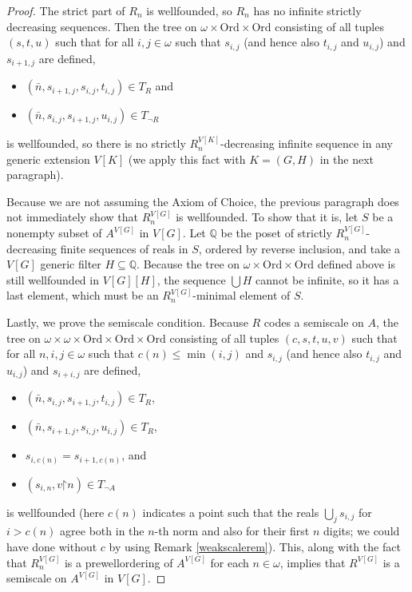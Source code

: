 \documentclass[10pt,a4paper]{amsart}
\newcommand{\Ord}{\mathrm{Ord}}
\newcommand{\restrict}{\mathord{\restriction}}
\begin{document}
\begin{proof}
The strict part of $R_n$ is wellfounded, so $R_n$ has no infinite strictly decreasing sequences.
 Then the tree on $\omega \times \Ord \times \Ord$ consisting of all tuples $(s, t, u)$
 such that for all $i,j \in \omega$ such that $s_{i,j}$ (and hence also $t_{i,j}$ and $u_{i,j}$) and $s_{i+1,j}$ are defined,
\begin{itemize}
 \item $(\bar{n}, s_{i+1, j}, s_{i,j}, t_{i,j}) \in T_R$ and
 \item $(\bar{n}, s_{i,j}, s_{i+1,j}, u_{i,j}) \in T_{\neg R}$
\end{itemize}
 is wellfounded, so there is no strictly $R^{V[K]}_n$-decreasing infinite sequence in any generic extension $V[K]$ (we apply this fact with $K = (G,H)$ in the next paragraph).

Because we are not assuming the Axiom of Choice, the previous paragraph does not immediately show that
 $R^{V[G]}_n$ is wellfounded.  
 To show that it is, let $S$ be a nonempty subset of $A^{V[G]}$ in $V[G]$.
 Let $\mathbb{Q}$ be the poset of strictly $R^{V[G]}_n$-decreasing finite sequences
 of reals in $S$, ordered by reverse inclusion,
 and take a $V[G]$ generic filter $H \subseteq \mathbb{Q}$.
 Because the tree on $\omega \times \Ord \times \Ord$
 defined above is still wellfounded in $V[G][H]$,
 the sequence
 $\bigcup H$ cannot be infinite, so it has a last element, which must be
 an $R^{V[G]}_n$-minimal element of $S$.

Lastly, we prove the semiscale condition.
Because $R$ codes a semiscale
on $A$, the tree on $\omega \times \omega \times \Ord \times \Ord \times \Ord$ consisting of all tuples
$(c, s, t, u, v)$ such that
for all $n,i,j \in \omega$ such that $c(n) \le \min(i,j)$ and
$s_{i,j}$ (and hence also $t_{i,j}$ and $u_{i,j}$) and $s_{i+i,j}$
are defined, 
\begin{itemize}
 \item $(\bar{n}, s_{i,j}, s_{i+1,j}, t_{i,j}) \in T_R$,
 \item $(\bar{n}, s_{i+1,j}, s_{i,j}, u_{i,j}) \in T_R$,
 \item $s_{i,c(n)} = s_{i+1,c(n)}$, and
 \item $(s_{i,n}, v \restrict n) \in T_{\neg A}$
\end{itemize}
is wellfounded (here $c(n)$ indicates a point such that the reals $\bigcup_{j}s_{i,j}$ for $i > c(n)$ agree both in the $n$-th norm and also for their first $n$ digits; we could have done without $c$ by using Remark \ref{weakscalerem}).  This, along with the fact that $R^{V[G]}_n$ is a prewellordering of $A^{V[G]}$ for each $n \in \omega$, implies that $R^{V[G]}$ is a semiscale on $A^{V[G]}$ in $V[G]$.
\end{proof}
\end{document}
